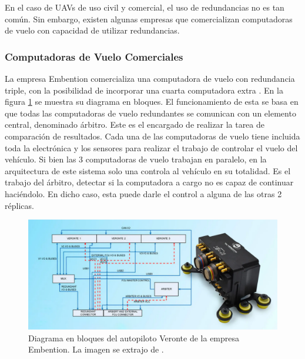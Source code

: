 En el caso de UAVs de uso civil y comercial, el uso de redundancias no es tan común. Sin embargo, existen algunas empresas que comercializan computadoras de vuelo con capacidad de utilizar redundancias. %

\subsubsection{Computadoras de Vuelo Comerciales}

La empresa Embention comercializa una computadora de vuelo con redundancia triple, con la posibilidad de incorporar una cuarta computadora extra \cite{embention-2023}. En la figura \ref{fig:Veronte_Embention} se muestra su diagrama en bloques. El funcionamiento de esta se basa en que todas las computadoras de vuelo redundantes se comunican con un elemento central, denominado árbitro. Este es el encargado de realizar la tarea de comparación de resultados. Cada una de las computadoras de vuelo tiene incluida toda la electrónica y los sensores para realizar el trabajo de controlar el vuelo del vehículo. Si bien las 3 computadoras de vuelo trabajan en paralelo, en la arquitectura de este sistema solo una controla al vehículo en su totalidad. Es el trabajo del árbitro, detectar si la computadora a cargo no es capaz de continuar haciéndolo. En dicho caso, esta puede darle el control a alguna de las otras 2 réplicas.

\begin{figure}[htb]
    \centering
    \includegraphics[width=\textwidth]{img/Veronte_Embention.png}
    \caption{Diagrama en bloques del autopiloto Veronte de la empresa Embention. La imagen se extrajo de \cite{embention-2023}.}
    \label{fig:Veronte_Embention}    
\end{figure}


